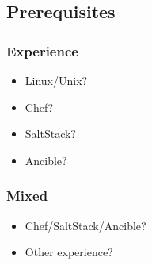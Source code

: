 \subsection{Prerequisites}
\frame
{
  \frametitle{Experience}

  \begin{itemize}
  \item<1-> Linux/Unix?
  \item<2-> Chef?
  \item<3-> SaltStack?
  \item<4-> Ancible?
  \end{itemize}
}

\frame
{
  \frametitle{Mixed}
  \begin{itemize}
  \item<1-> Chef/SaltStack/Ancible?
  \item<2-> Other experience?
  \end{itemize}
}
